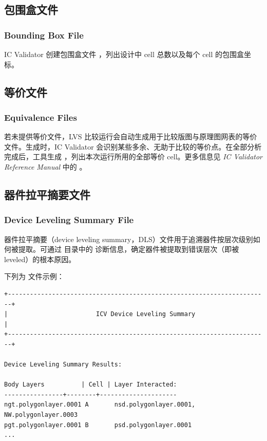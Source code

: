 \subsection{包围盒文件}
\subsubsection*{Bounding Box File}

IC Validator 创建包围盒文件 ，列出设计中 cell 总数以及每个 cell 的包围盒坐标。

\subsection{等价文件}
\subsubsection*{Equivalence Files}

若未提供等价文件，LVS 比较运行会自动生成用于比较版图与原理图网表的等价文件。生成时，IC Validator 会识别某些多余、无助于比较的等价点。在全部分析完成后，工具生成 ，列出本次运行所用的全部等价 cell。更多信息见 \textit{IC Validator Reference Manual} 中的 。

\subsection{器件拉平摘要文件}
\subsubsection*{Device Leveling Summary File}

器件拉平摘要（device leveling summary，DLS）文件用于追溯器件按层次级别如何被提取。可通过  目录中的  诊断信息，确定器件被提取到错误层次（即被 leveled）的根本原因。

下列为  文件示例：
\begin{lstlisting}
+-----------------------------------------------------------------------+
|                        ICV Device Leveling Summary                    |
+-----------------------------------------------------------------------+

Device Leveling Summary Results:

Body Layers          | Cell | Layer Interacted:
----------------+--------+---------------------
ngt.polygonlayer.0001 A       nsd.polygonlayer.0001, NW.polygonlayer.0003
pgt.polygonlayer.0001 B       psd.polygonlayer.0001
...
\end{lstlisting}

